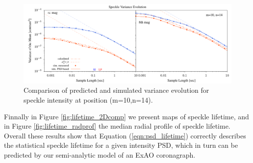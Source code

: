 \documentclass[11pt,preprint]{aastex}
\begin{document}
\begin{figure}
\hspace{-0.3in}
\includegraphics[width=6.5in]{binVarComp_lp_10_14.pdf}
\caption{Comparison of predicted and simulated variance evolution for speckle intensity at position (m=10,n=14). \label{fig:binvarcomp}}
\end{figure}

Finnally in Figure \ref{fig:lifetime_2Dcomp} we present maps of speckle lifetime, and in Figure \ref{fig:lifetime_radprof} the median radial profile of speckle lifetime.  Overall these results show that Equation (\ref{eqn:psd_lifetime}) correctly describes the statistical speckle lifetime for a given intensity PSD, which in turn can be predicted by our semi-analytic model of an ExAO coronagraph.
\end{document}
